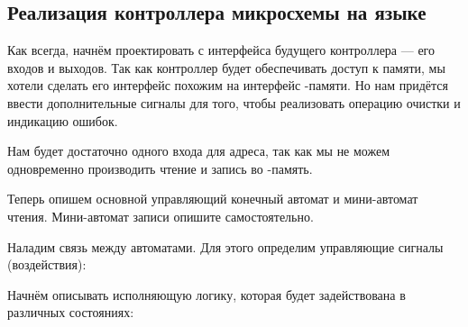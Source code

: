 \subsection{Реализация контроллера микросхемы  на языке }
\par{Как всегда, начнём проектировать с интерфейса будущего контроллера --- его входов и выходов. Так как контроллер будет обеспечивать доступ к памяти, мы хотели сделать его интерфейс похожим на интерфейс -памяти. Но нам придётся ввести дополнительные сигналы для того, чтобы реализовать операцию очистки и индикацию ошибок.}
\par{Нам будет достаточно одного входа для адреса, так как мы не можем одновременно производить чтение и запись во -память.}
\par{Теперь опишем основной управляющий конечный автомат и мини-автомат чтения. Мини-автомат записи опишите самостоятельно.}
\par{Наладим связь между автоматами. Для этого определим управляющие сигналы (воздействия):}
\par{Начнём описывать исполняющую логику, которая будет задействована в различных состояниях:}
